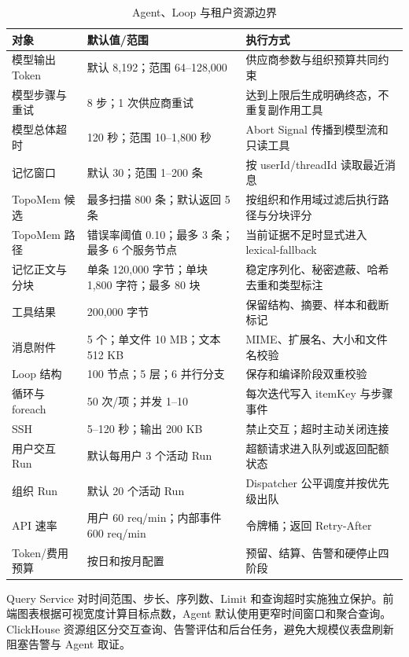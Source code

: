 \documentclass[conference,10pt]{IEEEtran}
\begin{document}
\begin{table}[t]
\caption{Agent、Loop 与租户资源边界}
\label{tab:limits}
\centering
\small
\begin{tabularx}{\textwidth}{p{3.0cm}p{3.2cm}Y}
\toprule
\textbf{对象} & \textbf{默认值/范围} & \textbf{执行方式} \\
\midrule
模型输出 Token & 默认 8,192；范围 64--128,000 & 供应商参数与组织预算共同约束 \\
模型步骤与重试 & 8 步；1 次供应商重试 & 达到上限后生成明确终态，不重复副作用工具 \\
模型总体超时 & 120 秒；范围 10--1,800 秒 & Abort Signal 传播到模型流和只读工具 \\
记忆窗口 & 默认 30；范围 1--200 条 & 按 userId/threadId 读取最近消息 \\
TopoMem 候选 & 最多扫描 800 条；默认返回 5 条 & 按组织和作用域过滤后执行路径与分块评分 \\
TopoMem 路径 & 错误率阈值 0.10；最多 3 条；最多 6 个服务节点 & 当前证据不足时显式进入 lexical-fallback \\
记忆正文与分块 & 单条 120,000 字节；单块 1,800 字符；最多 80 块 & 稳定序列化、秘密遮蔽、哈希去重和类型标注 \\
工具结果 & 200,000 字节 & 保留结构、摘要、样本和截断标记 \\
消息附件 & 5 个；单文件 10 MB；文本 512 KB & MIME、扩展名、大小和文件名校验 \\
Loop 结构 & 100 节点；5 层；6 并行分支 & 保存和编译阶段双重校验 \\
循环与 foreach & 50 次/项；并发 1--10 & 每次迭代写入 itemKey 与步骤事件 \\
SSH & 5--120 秒；输出 200 KB & 禁止交互；超时主动关闭连接 \\
用户交互 Run & 默认每用户 3 个活动 Run & 超额请求进入队列或返回配额状态 \\
组织 Run & 默认 20 个活动 Run & Dispatcher 公平调度并按优先级出队 \\
API 速率 & 用户 60 req/min；内部事件 600 req/min & 令牌桶；返回 Retry-After \\
Token/费用预算 & 按日和按月配置 & 预留、结算、告警和硬停止四阶段 \\
\bottomrule
\end{tabularx}
\end{table}

Query Service 对时间范围、步长、序列数、Limit 和查询超时实施独立保护。前端图表根据可视宽度计算目标点数，Agent 默认使用更窄时间窗口和聚合查询。ClickHouse 资源组区分交互查询、告警评估和后台任务，避免大规模仪表盘刷新阻塞告警与 Agent 取证。
\end{document}
